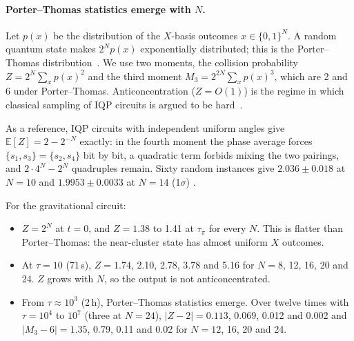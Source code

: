 \paragraph{Porter--Thomas statistics emerge with $N$.} Let $p(x)$ be the distribution of the $X$-basis outcomes $x\in\{0,1\}^N$. A random
quantum state makes $2^Np(x)$ exponentially distributed; this is the Porter--Thomas distribution~\cite{porter1956}. We use two moments, the collision probability $Z=2^N\sum_xp(x)^2$ and the
third moment $M_3=2^{2N}\sum_xp(x)^3$, which are 2 and 6 under Porter--Thomas. Anticoncentration ($Z=O(1)$) is the regime in which classical sampling of IQP circuits is argued to be hard~\cite{bremner2011,bremner2016}.

As a reference, IQP circuits with independent uniform angles give $\mathbb E[Z]=2-2^{-N}$ exactly: in the fourth moment the phase average
forces $\{s_1,s_3\}=\{s_2,s_4\}$ bit by bit, a quadratic term forbids mixing the two pairings, and $2\cdot4^N-2^N$ quadruples remain. Sixty
random instances give $2.036\pm0.018$ at $N=10$ and $1.9953\pm0.0033$ at $N=14$ (1$\sigma$) .

For the gravitational circuit:
\begin{itemize}[nosep]
\item $Z=2^N$ at $t=0$, and $Z=1.38$ to 1.41 at $\tau_\pi$ for every $N$. This is flatter than Porter--Thomas: the near-cluster state has
almost uniform $X$ outcomes.
\item At $\tau=10$ (71\,s), $Z=1.74$, 2.10, 2.78, 3.78 and 5.16 for $N=8$, 12, 16, 20 and 24. $Z$ grows with $N$, so the output is not
anticoncentrated.
\item From $\tau\approx10^3$ (2\,h), Porter--Thomas statistics emerge. Over twelve times with $\tau=10^4$ to $10^7$ (three at $N=24$),
$|Z-2|=0.113$, 0.069, 0.012 and 0.002 and $|M_3-6|=1.35$, 0.79, 0.11 and 0.02 for $N=12$, 16, 20 and 24.
\end{itemize}

